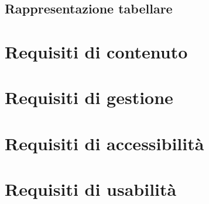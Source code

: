 \subsection{Rappresentazione tabellare}

\section{Requisiti di contenuto}\label{sec:requisiti-di-contenuto}

\section{Requisiti di gestione}\label{sec:requisiti-di-gestione}

\section{Requisiti di accessibilità}\label{sec:requisiti-di-accessibilita}

\section{Requisiti di usabilità}\label{sec:requisiti-di-usabilita}
